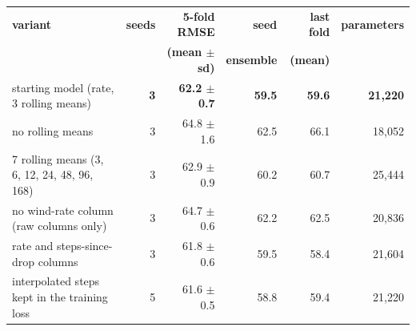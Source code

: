 \begin{tabular}{@{}p{2.9in}rrrrr@{}}
\toprule
\textbf{variant} & \textbf{seeds} & \textbf{5-fold RMSE} & \textbf{seed} & \textbf{last fold} & \textbf{parameters} \\
 & & \textbf{(mean $\pm$ sd)} & \textbf{ensemble} & \textbf{(mean)} & \\
\midrule
{starting model (rate, 3 rolling means)} & \textbf{3} & \textbf{62.2 $\pm$ 0.7} & \textbf{59.5} & \textbf{59.6} & \textbf{21{,}220} \\
no rolling means & 3 & 64.8 $\pm$ 1.6 & 62.5 & 66.1 & 18{,}052 \\
7 rolling means (3, 6, 12, 24, 48, 96, 168) & 3 & 62.9 $\pm$ 0.9 & 60.2 & 60.7 & 25{,}444 \\
no wind-rate column (raw columns only) & 3 & 64.7 $\pm$ 0.6 & 62.2 & 62.5 & 20{,}836 \\
rate and steps-since-drop columns & 3 & 61.8 $\pm$ 0.6 & 59.5 & 58.4 & 21{,}604 \\
interpolated steps kept in the training loss & 5 & 61.6 $\pm$ 0.5 & 58.8 & 59.4 & 21{,}220 \\
\bottomrule
\end{tabular}
